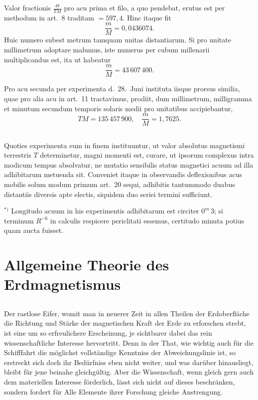 \documentclass[fontsize=11pt,paper=a4,twoside,openany]{scrbook}
\begin{document}
Valor fractionis $\frac{\Theta}{TM}$ pro acu prima et filo, a quo pendebat, erutus est per methodum in art.~8 traditam $=597{,}4$. Hinc itaque fit
\[
\frac{m}{M} = 0{,}0436074.
\]
Huic numero subest metrum tamquam unitas distantiarum. Si pro unitate millimetrum adoptare malumus, iste numerus per cubum millenarii multiplicandus est, ita ut habeatur
\[
\frac{m}{M} = 43\,607\,400.
\]

Pro acu secunda per experimenta d.~28.~Juni instituta iisque prorsus similia, quae pro alia acu in art.~11 tractavimus, prodiit, dum millimetrum, milligramma et minutum secundum temporis solaris medii pro unitatibus accipiebantur,
\[
TM = 135\,457\,900,\quad \frac{m}{M} = 1{,}7625.
\]

\section{}

Quoties experimenta eum in finem instituuntur, ut valor absolutus magnetismi terrestris $T$ determinetur, magni momenti est, curare, ut ipsorum complexus intra modicum tempus absolvatur, ne mutatio sensibilis status magnetici acuum ad illa adhibitarum metuenda sit. Conveniet itaque in observandis deflexionibus acus mobilis solum modum primum art.~20 sequi, adhibitis tantummodo duabus distantiis diversis apte electis, siquidem duo seriei termini sufficiunt.

$^{*)}$ Longitudo acuum in his experimentis adhibitarum est circiter $0^{m}\,3$; si terminum $R^{-6}$ in calculis respicere periclitati essemus, certitudo minuta potius quam aucta fuisset.

\bigskip


\chapter*{Allgemeine Theorie des Erdmagnetismus}

\section*{}\label{sec:intro}

Der rastlose Eifer, womit man in neuerer Zeit in allen Theilen der Erdoberfläche die Richtung und Stärke der magnetischen Kraft der Erde zu erforschen strebt, ist eine um so erfreulichere Erscheinung, je sichtbarer dabei das rein wissenschaftliche Interesse hervortritt. Denn in der That, wie wichtig auch für die Schifffahrt die möglichst vollständige Kenntniss der Abweichungslinie ist, so erstreckt sich doch ihr Bedürfniss eben nicht weiter, und was darüber hinausliegt, bleibt für jene beinahe gleichgültig. Aber die Wissenschaft, wenn gleich gern auch dem materiellen Interesse förderlich, lässt sich nicht auf dieses beschränken, sondern fordert für Alle Elemente ihrer Forschung gleiche Anstrengung.
\end{document}
